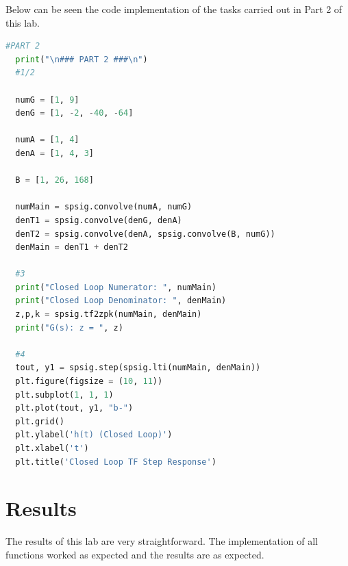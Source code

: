 \documentclass[12pt]{report}
\begin{document}
Below can be seen the code implementation of the tasks carried out in Part 2 of this lab.
\begin{lstlisting}[language=Python, basicstyle=\footnotesize]
  #PART 2
  print("\n### PART 2 ###\n")
  #1/2
  
  numG = [1, 9]
  denG = [1, -2, -40, -64]
  
  numA = [1, 4]
  denA = [1, 4, 3]
  
  B = [1, 26, 168]
  
  numMain = spsig.convolve(numA, numG)
  denT1 = spsig.convolve(denG, denA)
  denT2 = spsig.convolve(denA, spsig.convolve(B, numG))
  denMain = denT1 + denT2
  
  #3
  print("Closed Loop Numerator: ", numMain)
  print("Closed Loop Denominator: ", denMain)
  z,p,k = spsig.tf2zpk(numMain, denMain)
  print("G(s): z = ", z)
  
  #4
  tout, y1 = spsig.step(spsig.lti(numMain, denMain))
  plt.figure(figsize = (10, 11))
  plt.subplot(1, 1, 1)
  plt.plot(tout, y1, "b-")
  plt.grid()
  plt.ylabel('h(t) (Closed Loop)')
  plt.xlabel('t')
  plt.title('Closed Loop TF Step Response')
\end{lstlisting}

\section{Results}\label{section: Results}
The results of this lab are very straightforward. The implementation of all functions worked as expected and the results are as expected.
\end{document}

